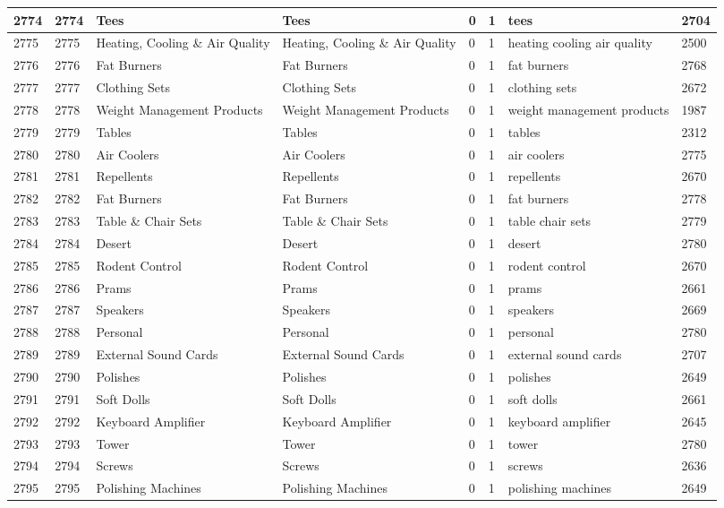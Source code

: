 \begin{longtable}{|l|l|l|l|l|l|l|l|}
2774 & 2774 & Tees & Tees & 0 & 1 & tees & 2704 \\ \hline 
2775 & 2775 & Heating, Cooling \& Air Quality & Heating, Cooling \& Air Quality & 0 & 1 & heating cooling air quality & 2500 \\ \hline 
2776 & 2776 & Fat Burners & Fat Burners & 0 & 1 & fat burners & 2768 \\ \hline 
2777 & 2777 & Clothing Sets & Clothing Sets & 0 & 1 & clothing sets & 2672 \\ \hline 
2778 & 2778 & Weight Management Products & Weight Management Products & 0 & 1 & weight management products & 1987 \\ \hline 
2779 & 2779 & Tables & Tables & 0 & 1 & tables & 2312 \\ \hline 
2780 & 2780 & Air Coolers & Air Coolers & 0 & 1 & air coolers & 2775 \\ \hline 
2781 & 2781 & Repellents & Repellents & 0 & 1 & repellents & 2670 \\ \hline 
2782 & 2782 & Fat Burners & Fat Burners & 0 & 1 & fat burners & 2778 \\ \hline 
2783 & 2783 & Table \& Chair Sets & Table \& Chair Sets & 0 & 1 & table chair sets & 2779 \\ \hline 
2784 & 2784 & Desert & Desert & 0 & 1 & desert & 2780 \\ \hline 
2785 & 2785 & Rodent Control & Rodent Control & 0 & 1 & rodent control & 2670 \\ \hline 
2786 & 2786 & Prams & Prams & 0 & 1 & prams & 2661 \\ \hline 
2787 & 2787 & Speakers & Speakers & 0 & 1 & speakers & 2669 \\ \hline 
2788 & 2788 & Personal & Personal & 0 & 1 & personal & 2780 \\ \hline 
2789 & 2789 & External Sound Cards & External Sound Cards & 0 & 1 & external sound cards & 2707 \\ \hline 
2790 & 2790 & Polishes & Polishes & 0 & 1 & polishes & 2649 \\ \hline 
2791 & 2791 & Soft Dolls & Soft Dolls & 0 & 1 & soft dolls & 2661 \\ \hline 
2792 & 2792 & Keyboard Amplifier & Keyboard Amplifier & 0 & 1 & keyboard amplifier & 2645 \\ \hline 
2793 & 2793 & Tower & Tower & 0 & 1 & tower & 2780 \\ \hline 
2794 & 2794 & Screws & Screws & 0 & 1 & screws & 2636 \\ \hline 
2795 & 2795 & Polishing Machines & Polishing Machines & 0 & 1 & polishing machines & 2649 \\ \hline 

\end{longtable}
